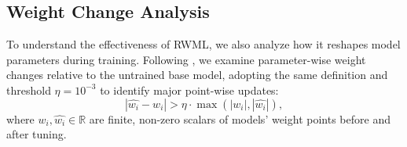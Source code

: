 \documentclass{article}
\theoremstyle{plain}
\theoremstyle{definition}
\theoremstyle{remark}
\newcommand{\policyrl}[0]{Policy RL}
\newcommand{\shortmethod}[0]{RWML}
\newcommand{\wmrlshort}[0]{\shortmethod}
\newcommand{\wmsftshort}[0]{WM SFT}
\begin{document}

\subsection{Weight Change Analysis}
\label{sec:analysis_weight_change}

To understand the effectiveness of \wmrlshort{}, we also analyze how it reshapes model parameters during training. Following \citet{zhu2025the}, we examine parameter-wise weight changes relative to the untrained base model, adopting the same definition and threshold $\eta = 10^{-3}$ to identify major point-wise updates:
\[
|\hat{w_i}-w_i|>\eta\cdot\max(|w_i|,|\hat{w_i}|),
\]
where $w_i,\hat{w_i}\in\mathbb{R}$ are finite, non-zero scalars of models' weight points before and after tuning. 



\end{document}
